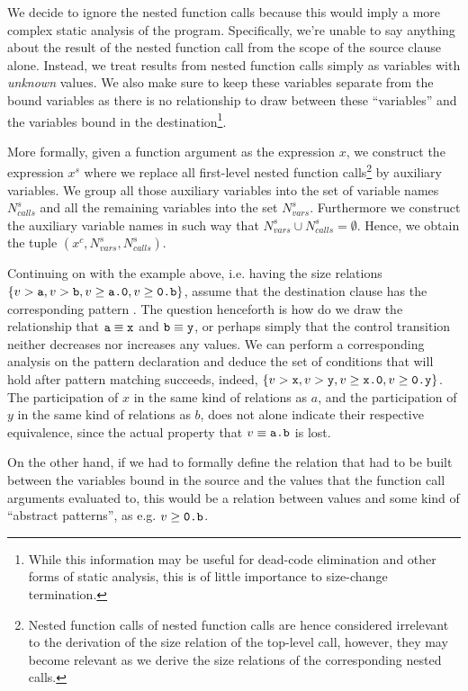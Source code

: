 We decide to ignore the nested function calls because this would imply a more
complex static analysis of the program. Specifically, we're unable to say
anything about the result of the nested function call from the scope of the
source clause alone. Instead, we treat results from nested function calls
simply as variables with \emph{unknown} values. We also make sure to keep these
variables separate from the bound variables as there is no relationship to draw
between these ``variables'' and the variables bound in the
destination\footnote{While this information may be useful for dead-code
elimination and other forms of static analysis, this is of little importance to
size-change termination.}.

More formally, given a function argument as the expression $x$, we construct
the expression $x^s$ where we replace all first-level nested function
calls\footnote{Nested function calls of nested function calls are hence
considered irrelevant to the derivation of the size relation of the top-level
call, however, they may become relevant as we derive the size relations of the
corresponding nested calls.} by auxiliary variables.  We group all those
auxiliary variables into the set of variable names $N_{calls}^s$ and all the
remaining variables into the set $N_{vars}^s$.  Furthermore we construct the
auxiliary variable names in such way that $N_{vars}^s\cup
N_{calls}^s=\emptyset$.  Hence, we obtain the tuple
$(x^c,N_{vars}^s,N_{calls}^s)$.

Continuing on with the example above, i.e. having the size relations
$\{v>\text{{\ttfamily a}}, v> \text{{\ttfamily b}}, v\geq \text{{\ttfamily a.0}}, v\geq \text{{\ttfamily0.b}}\}$, assume
that the destination clause has the corresponding pattern . The
question henceforth is how do we draw the relationship that
$\text{{\ttfamily a}}\equiv\text{{\ttfamily x}}$ and $\text{{\ttfamily b}}\equiv\text{{\ttfamily y}}$, or perhaps simply
that the control transition neither decreases nor increases any values. We can
perform a corresponding analysis on the pattern declaration and deduce the set
of conditions that will hold after pattern matching succeeds, indeed,
$\{v>\text{{\ttfamily x}}, v> \text{{\ttfamily y}}, v\geq \text{{\ttfamily x.0}}, v\geq \text{{\ttfamily0.y}}\}$. The
participation of $x$ in the same kind of relations as $a$, and the
participation of $y$ in the same kind of relations as $b$, does not alone
indicate their respective equivalence, since the actual property that
$v\equiv\text{{\ttfamily a.b}}$ is lost.

On the other hand, if we had to formally define the relation that had to be
built between the variables bound in the source and the values that the
function call arguments evaluated to, this would be a relation between values
and some kind of ``abstract patterns'', as e.g. $v\geq\text{{\ttfamily0.b}}$.

